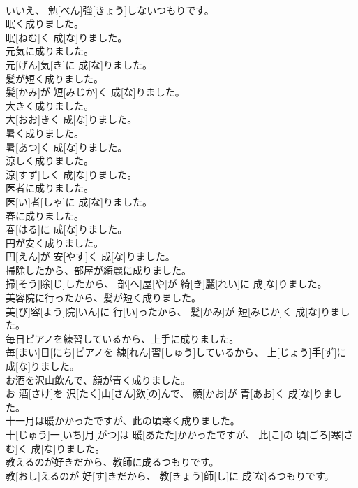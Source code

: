 \documentclass[8pt]{extreport}
\begin{document}
\begin{CJK}{UTF8}{min}
\\	いいえ、 勉[べん]強[きょう]しないつもりです。
\\	眠く成りました。	
\\	眠[ねむ]く 成[な]りました。
\\	元気に成りました。	
\\	元[げん]気[き]に 成[な]りました。
\\	髪が短く成りました。	
\\	髪[かみ]が 短[みじか]く 成[な]りました。
\\	大きく成りました。	
\\	大[おお]きく 成[な]りました。
\\	暑く成りました。	
\\	暑[あつ]く 成[な]りました。
\\	涼しく成りました。	
\\	涼[すず]しく 成[な]りました。
\\	医者に成りました。	
\\	医[い]者[しゃ]に 成[な]りました。
\\	春に成りました。	
\\	春[はる]に 成[な]りました。
\\	円が安く成りました。	
\\	円[えん]が 安[やす]く 成[な]りました。
\\	掃除したから、部屋が綺麗に成りました。	
\\	掃[そう]除[じ]したから、 部[へ]屋[や]が 綺[き]麗[れい]に 成[な]りました。
\\	美容院に行ったから、髪が短く成りました。	
\\	美[び]容[よう]院[いん]に 行[い]ったから、 髪[かみ]が 短[みじか]く 成[な]りました。
\\	毎日ピアノを練習しているから、上手に成りました。	
\\	毎[まい]日[にち]ピアノを 練[れん]習[しゅう]しているから、 上[じょう]手[ず]に 成[な]りました。
\\	お酒を沢山飲んで、顔が青く成りました。	
\\	お 酒[さけ]を 沢[たく]山[さん]飲[の]んで、 顔[かお]が 青[あお]く 成[な]りました。
\\	十一月は暖かかったですが、此の頃寒く成りました。	
\\	十[じゅう]一[いち]月[がつ]は 暖[あたた]かかったですが、 此[こ]の 頃[ごろ]寒[さむ]く 成[な]りました。
\\	教えるのが好きだから、教師に成るつもりです。	
\\	教[おし]えるのが 好[す]きだから、 教[きょう]師[し]に 成[な]るつもりです。

\end{CJK}
\end{document}
